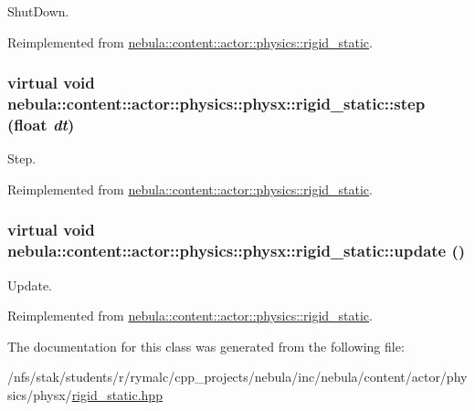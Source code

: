ShutDown. 

Reimplemented from \hyperlink{classnebula_1_1content_1_1actor_1_1physics_1_1rigid__static_acbf24424c29fa78f568f67fe80cee108}{nebula::content::actor::physics::rigid\_\-static}.\hypertarget{classnebula_1_1content_1_1actor_1_1physics_1_1physx_1_1rigid__static_a06213f6134a1f1efbbfead280cd185e7}{
\subsubsection[{step}]{\setlength{\rightskip}{0pt plus 5cm}virtual void nebula::content::actor::physics::physx::rigid\_\-static::step (float {\em dt})}}
\label{classnebula_1_1content_1_1actor_1_1physics_1_1physx_1_1rigid__static_a06213f6134a1f1efbbfead280cd185e7}


Step. 

Reimplemented from \hyperlink{classnebula_1_1content_1_1actor_1_1physics_1_1rigid__static_a83be7bda449d94b5d7a69c8b8f99f6de}{nebula::content::actor::physics::rigid\_\-static}.\hypertarget{classnebula_1_1content_1_1actor_1_1physics_1_1physx_1_1rigid__static_ada05e897e2f4dd915f525893fc027f39}{
\subsubsection[{update}]{\setlength{\rightskip}{0pt plus 5cm}virtual void nebula::content::actor::physics::physx::rigid\_\-static::update ()}}
\label{classnebula_1_1content_1_1actor_1_1physics_1_1physx_1_1rigid__static_ada05e897e2f4dd915f525893fc027f39}


Update. 

Reimplemented from \hyperlink{classnebula_1_1content_1_1actor_1_1physics_1_1rigid__static_a8ecc4b9b308562ab3942bdac5b8ddfea}{nebula::content::actor::physics::rigid\_\-static}.

The documentation for this class was generated from the following file:\begin{DoxyCompactItemize}
\item 
/nfs/stak/students/r/rymalc/cpp\_\-projects/nebula/inc/nebula/content/actor/physics/physx/\hyperlink{physics_2physx_2rigid__static_8hpp}{rigid\_\-static.hpp}\end{DoxyCompactItemize}

